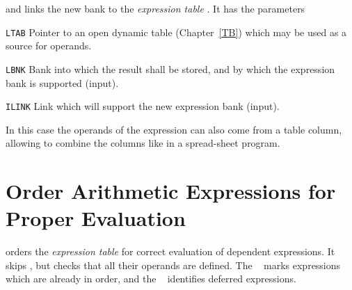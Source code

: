 and links the new bank to the {\em expression table}
.
It has the parameters
\begin{mylist}
\item[\tt LTAB]
Pointer to an open dynamic table (Chapter~\ref{TB})
which may be used as a source for operands. 
\item[\tt LBNK]
Bank into which the result shall be stored,
and by which the expression bank is supported (input).
\item[\tt ILINK]
Link which will support the new expression bank (input).
\end{mylist}
In this case the operands of the expression can also come from a table
column,
allowing to combine the columns like in a spread-sheet program.

\section{Order Arithmetic Expressions for Proper Evaluation}
\label{EXORDR}
orders the {\em expression table} for correct
evaluation of dependent expressions.
It skips ,
but checks that all their operands are defined.
The ~ marks expressions which are
already in order,
and the ~ identifies deferred
expressions.

